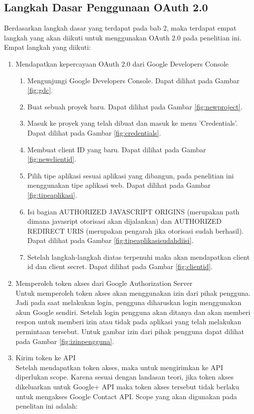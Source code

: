 \subsection{Langkah Dasar Penggunaan OAuth 2.0}
Berdasarkan langkah dasar yang terdapat pada bab 2, maka terdapat empat langkah yang akan diikuti untuk menggunakan OAuth 2.0 pada penelitian ini. Empat langkah yang diikuti:
\begin{enumerate}
\item Mendapatkan kepercayaan OAuth 2.0 dari Google Developers Console\\
    \begin{enumerate}
    \item Mengunjungi Google Developers Console. Dapat dilihat pada Gambar \ref{fig:gdc}.
    \item Buat sebuah proyek baru. Dapat dilihat pada Gambar \ref{fig:newproject}.
    \item Masuk ke proyek yang telah dibuat dan masuk ke menu 'Credentials'. Dapat dilihat pada Gambar \ref{fig:credentials}.
    \item Membuat client ID yang baru. Dapat dilihat pada Gambar \ref{fig:newclientid}.
    \item Pilih tipe aplikasi sesuai aplikasi yang dibangun, pada penelitian ini menggunakan tipe aplikasi web. Dapat dilihat pada Gambar \ref{fig:tipeaplikasi}.
    \item Isi bagian AUTHORIZED JAVASCRIPT ORIGINS (merupakan path dimana javasript otorisasi akan dijalankan) dan AUTHORIZED REDIRECT URIS (merupakan pengarah jika otorisasi sudah berhasil). Dapat dilihat pada Gambar \ref{fig:tipeaplikasisudahdiisi}.
    \item Setelah langkah-langkah diatas terpenuhi maka akan mendapatkan client id dan client secret. Dapat dilihat pada Gambar \ref{fig:clientid}.
    \end{enumerate}
\item Memperoleh token akses dari Google Authorization Server\\
Untuk memperoleh token akses akan menggunakan izin dari pihak pengguna. Jadi pada saat melakukan login, pengguna diharuskan login menggunakan akun Google sendiri. Setelah login pengguna akan ditanya dan akan memberi respon untuk memberi izin atau tidak pada aplikasi yang telah melakukan permintaan tersebut. Untuk gambar izin dari pihak pengguna dapat dilihat pada Gambar \ref{fig:izinpengguna}.
\item Kirim token ke API\\
Setelah mendapatkan token akses, maka untuk mengirimkan ke API diperlukan scope. Karena sesuai dengan landasan teori, jika token akses dikeluarkan untuk Google+ API maka token akses tersebut tidak berlaku untuk mengakses Google Contact API. Scope yang akan digunakan pada penelitan ini adalah:

\end{enumerate}
